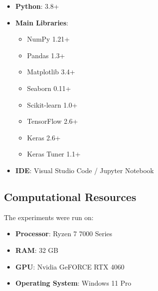 \documentclass[12pt,a4paper]{article}
\begin{document}
\begin{itemize}
    \item \textbf{Python}: 3.8+
    \item \textbf{Main Libraries}:
    \begin{itemize}
        \item NumPy 1.21+
        \item Pandas 1.3+
        \item Matplotlib 3.4+
        \item Seaborn 0.11+
        \item Scikit-learn 1.0+
        \item TensorFlow 2.6+
        \item Keras 2.6+
        \item Keras Tuner 1.1+
    \end{itemize}
    \item \textbf{IDE}: Visual Studio Code / Jupyter Notebook
\end{itemize}

\subsection{Computational Resources}

The experiments were run on:
\begin{itemize}
    \item \textbf{Processor}: Ryzen 7 7000 Series
    \item \textbf{RAM}: 32 GB
    \item \textbf{GPU}: Nvidia GeFORCE RTX 4060
    \item \textbf{Operating System}: Windows 11 Pro
\end{itemize}
\end{document}
